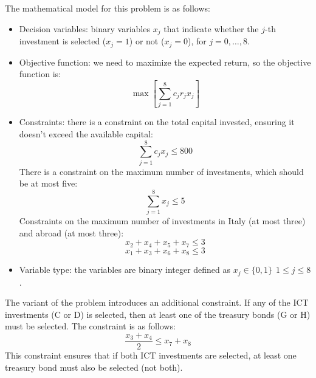 \begin{example}
    The mathematical model for this problem is as follows:
    \begin{itemize}
        \item Decision variables: binary variables $x_j$ that indicate whether the $j$-th investment is selected ($x_j=1$) or not ($x_j=0$), for $j=0,\dots, 8$.          
        \item Objective function: we need to maximize the expected return, so the objective function is:
            \[\max{\left[\sum_{j=1}^8{c_jr_jx_j}\right]}\]
        \item Constraints: there is a constraint on the total capital invested, ensuring it doesn't exceed the available capital:
            \[\sum_{j=1}^8{c_jx_j} \leq 800\]
            There is a constraint on the maximum number of investments, which should be at most five:
            \[\sum_{j=1}^8{x_j} \leq 5\]
            Constraints on the maximum number of investments in Italy (at most three) and abroad (at most three):
            \[x_2+x_4+x_5+x_7 \leq 3\]
            \[x_1+x_3+x_6+x_8 \leq 3\]
        \item Variable type: the variables are binary integer defined as $x_j \in \{0,1\} \:\: 1 \leq j \leq 8$. 
    \end{itemize}
    The variant of the problem introduces an additional constraint. 
    If any of the ICT investments (C or D) is selected, then at least one of the treasury bonds (G or H) must be selected. 
    The constraint is as follows:
    \[\dfrac{x_3+x_4}{2} \leq x_7+x_8\]
    This constraint ensures that if both ICT investments are selected, at least one treasury bond must also be selected (not both).
\end{example}
